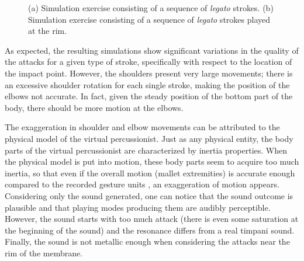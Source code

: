 \begin{figure}%
	\begin{center}
		\hspace{1cm}
	\end{center}
	\vspace{-0.5cm}
	\caption[Simulated exercises: validation of playing modes and impact locations]{(a) Simulation exercise consisting of a sequence of \emph{legato} strokes. (b) Simulation exercise consisting of a sequence of \emph{legato} strokes played at the rim.}
	\label{fig:gesture}
\end{figure}

As expected, the resulting simulations show significant variations in the quality of the attacks for a given type of stroke, specifically with respect to the location of the impact point. However, the shoulders present very large movements; there is an excessive shoulder rotation for each single stroke, making the position of the elbows not accurate. In fact, given the steady position of the bottom part of the body, there should be more motion at the elbows.

The exaggeration in shoulder and elbow movements can be attributed to the physical model of the virtual percussionist. Just as any physical entity, the body parts of the virtual percussionist are characterized by inertia properties. When the physical model is put into motion, these body parts seem to acquire too much inertia, so that even if the overall motion (mallet extremities) is accurate enough compared to the recorded gesture units \cite{bouenard:AAA09}, an exaggeration of motion appears.\\

Considering only the sound generated, one can notice that the sound outcome is plausible and that playing modes producing them are audibly perceptible. However, the sound starts with too much attack (there is even some saturation at the beginning of the sound) and the resonance differs from a real timpani sound. Finally, the sound is not metallic enough when considering the attacks near the rim of the membrane.

